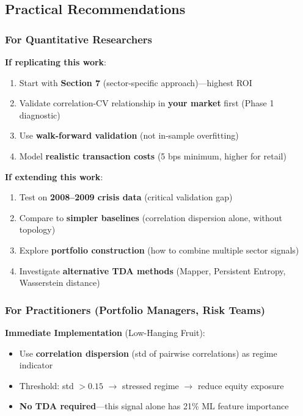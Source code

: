 \subsection{Practical Recommendations}

\subsubsection{For Quantitative Researchers}

\textbf{If replicating this work}:
\begin{enumerate}
\item Start with \textbf{Section 7} (sector-specific approach)---highest ROI
\item Validate correlation-CV relationship in \textbf{your market} first (Phase 1 diagnostic)
\item Use \textbf{walk-forward validation} (not in-sample overfitting)
\item Model \textbf{realistic transaction costs} (5 bps minimum, higher for retail)
\end{enumerate}

\textbf{If extending this work}:
\begin{enumerate}
\item Test on \textbf{2008--2009 crisis data} (critical validation gap)
\item Compare to \textbf{simpler baselines} (correlation dispersion alone, without topology)
\item Explore \textbf{portfolio construction} (how to combine multiple sector signals)
\item Investigate \textbf{alternative TDA methods} (Mapper, Persistent Entropy, Wasserstein distance)
\end{enumerate}

\subsubsection{For Practitioners (Portfolio Managers, Risk Teams)}

\textbf{Immediate Implementation} (Low-Hanging Fruit):
\begin{itemize}
\item Use \textbf{correlation dispersion} (std of pairwise correlations) as regime indicator
\item Threshold: std $> 0.15$ $\rightarrow$ stressed regime $\rightarrow$ reduce equity exposure
\item \textbf{No TDA required}---this signal alone has 21\% ML feature importance
\end{itemize}

